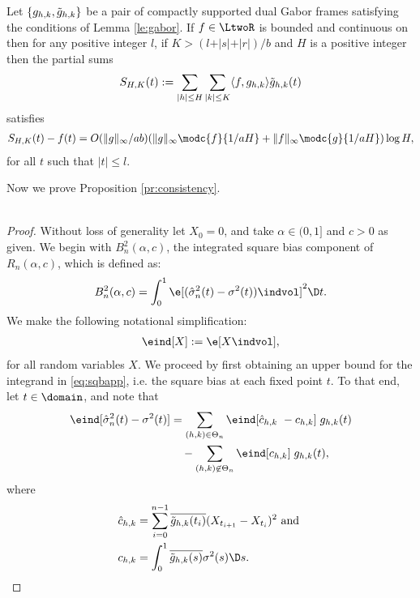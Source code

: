 \begin{appendices}
\begin{thm} \label{th:fourone}
  Let $\{g_{h,k}, \tilde{g}_{h,k}\}$ be a pair of compactly supported dual Gabor frames satisfying the conditions of Lemma \eqref{le:gabor}. If $f \in \LtwoR$ is bounded and continuous on \real then for any positive integer $l$, if $K > (l + \vert s \vert + \vert r \vert)/ b$ and $H$ is a positive integer then  the partial sums 
  \begin{align}
    S_{H,K} (t) := \sum_{\vert h \vert \le H} \sum_{\vert k \vert \le K} \langle{f},{g_{h,k}}\rangle \tilde{g}_{h,k}(t)  \notag
    \label{}
  \end{align}
  satisfies
  \begin{align}
    S_{H,K} (t) - f(t) = O({\Vert g \Vert_{\infty}}/{ab}) ( \Vert g \Vert_{\infty}\modc{f}{1/aH} + \Vert f \Vert_{\infty} \modc{g}{1/aH}) \log H\notag, 
    \label{}
  \end{align}
for all $t$ such that $\vert t\vert \le l$.
\end{thm}
\noindent Now we prove Proposition \eqref{pr:consistency}.\\\\
\begin{proof}
Without loss of generality let $X_0 = 0$, and  take $\alpha  \in (0, 1]$ and $c > 0$ as given. We begin with $B^2_n(\alpha, c)$, the integrated square bias component of $R_n(\alpha,c)$, which is defined as:
\begin{align}
  B^2_n(\alpha, c) = \int_0^1 \e[ (\svn(t) - \sigma^2(t))\indvol]^2 \D t. \label{eq:sqbapp}
\end{align}
We make the following notational simplification:
\begin{align}
  \eind [ X] := \e[ X \indvol], \notag
  \label{}
\end{align}
for all random variables $X$. We proceed by first obtaining an  upper bound  for the integrand in \eqref{eq:sqbapp}, i.e. the square bias at each fixed point $t$. To that end, let $t \in \domain$, and note that 
\begin{align}
  \eind[ \svn(t) - \sigma^2(t)] & = \sum_{(h,k) \in \Theta_n} \eind[\cnhk\ - \chk]\;g_{h,k}(t)\notag\\
  & \quad -\sum_{(h,k) \not\in \Theta_n} \eind[\chk]\;g_{h,k}(t),\label{eq:rone} 
\end{align}
  where 
\begin{align}  
  \cnhk &= \sum_{i =0}^{n-1} \btghki (X_{t_{i+1}} - X_{t_i})^2 \text{ and }\notag\\  
  \chk &= \int^1_0 \btghks \sigma^2(s) \D s. \notag
\end{align}

\end{proof}
\end{appendices}
